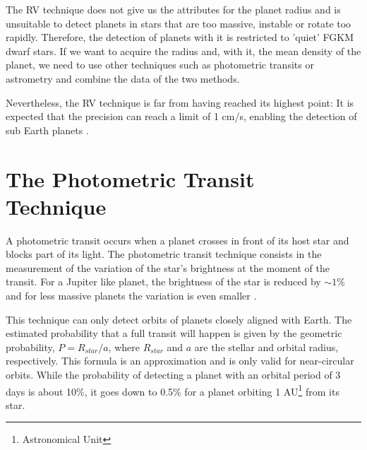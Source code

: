 \documentclass[dvips,12pt,a4paper]{report}
\begin{document}
The RV technique does not give us the attributes for the planet radius and is unsuitable to detect planets in stars that are too massive, instable or rotate too rapidly. Therefore, the detection of planets with it is restricted to 'quiet' FGKM dwarf stars. If we want to acquire the radius and, with it, the mean density of the planet, we need to use other techniques such as photometric transits or astrometry and combine the data of the two methods.

Nevertheless, the RV technique is far from having reached its highest point: It is expected that the precision can reach a limit of 1 cm/s, enabling the detection of sub Earth planets \citep{Lovis-2006b}.




\section{The Photometric Transit Technique}
\label{transit}
A photometric transit occurs when a planet crosses in front of its host star and blocks part of its light.
The photometric transit technique consists in the measurement of the variation of the star's brightness at the moment of the transit. For a Jupiter like planet, the brightness of the star is reduced by $\sim 1\%$ and for less massive planets the variation is even smaller \citep{Santos-2008}. %

This technique can only detect orbits of planets closely aligned with Earth. The estimated probability that a full transit will happen is given by the geometric probability, $P=R_{star}/a$, where $R_{star}$ and $a$ are the stellar and orbital radius, respectively. This formula is an approximation and is only valid for near-circular orbits. While the probability of detecting a planet with an orbital period of 3 days is about 10\%, it goes down to 0.5\% for a planet orbiting 1 AU\footnote{Astronomical Unit} from its star.
\end{document}
